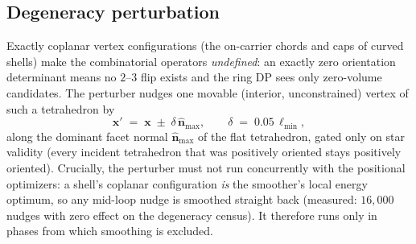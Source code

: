\documentclass[11pt,a4paper]{article}
\numberwithin{equation}{section}
\newcommand{\vv}[1]{\mathbf{#1}}
\begin{document}
\subsection{Degeneracy perturbation}
Exactly coplanar vertex configurations (the on-carrier chords and caps of
curved shells) make the combinatorial operators \emph{undefined}: an exactly
zero orientation determinant means no $2$--$3$ flip exists and the ring DP sees
only zero-volume candidates. The perturber nudges one movable (interior,
unconstrained) vertex of such a tetrahedron by
\begin{equation}
\vv x' \;=\; \vv x \;\pm\; \delta\,\hat{\vv n}_{\max},\qquad
\delta \;=\; 0.05\,\ell_{\min},
\label{eq:perturb}
\end{equation}
along the dominant facet normal $\hat{\vv n}_{\max}$ of the flat tetrahedron,
gated only on star validity (every incident tetrahedron that was positively
oriented stays positively oriented). Crucially, the perturber must not run
concurrently with the positional optimizers: a shell's coplanar configuration
\emph{is} the smoother's local energy optimum, so any mid-loop nudge is
smoothed straight back (measured: $16{,}000$ nudges with zero effect on the
degeneracy census). It therefore runs only in phases from which smoothing is
excluded.
\end{document}
